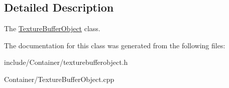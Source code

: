 \subsection{Detailed Description}
The \hyperlink{classEngine_1_1TextureBufferObject}{Texture\+Buffer\+Object} class. 

The documentation for this class was generated from the following files\+:\begin{DoxyCompactItemize}
\item 
include/\+Container/texturebufferobject.\+h\item 
Container/Texture\+Buffer\+Object.\+cpp\end{DoxyCompactItemize}
